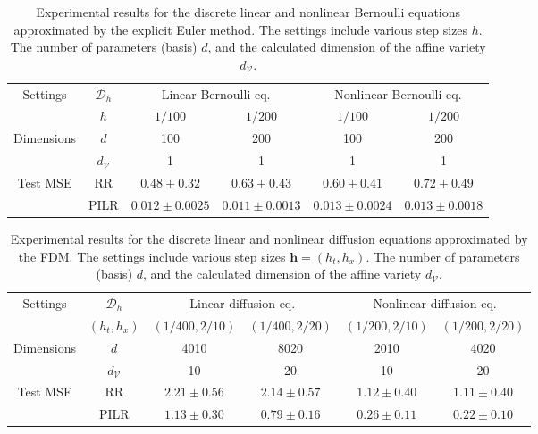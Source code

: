 \documentclass{article}
\theoremstyle{plain}
\theoremstyle{definition}
\theoremstyle{remark}
\begin{document}
\begin{table}[tb]
\caption{Experimental results for the discrete linear and nonlinear Bernoulli equations approximated by the explicit Euler method. The settings include various step sizes \(h\). The number of parameters (basis) \(d\), and the calculated dimension of the affine variety \(d_{\mathcal{V}}\).}
\label{tab:euler-bernoulli}
\begin{center}
\begin{tabular}{cc|cc|cc}
\toprule
\multirow{2}{*}{Settings} & \(\mathscr{D}_h\) & \multicolumn{2}{c|}{Linear Bernoulli eq.} & \multicolumn{2}{c}{Nonlinear Bernoulli eq.} \\ 
& \( h \) & \( 1/100 \) & \( 1/200 \) & \( 1/100 \) & \( 1/200 \)  \\
\multirow{2}{*}{Dimensions} & \( d \) & 100 & 200 & 100 & 200 \\
& \(d_{\mathcal{V}}\) & 1 & 1 & 1 & 1  \\ \midrule 
\multirow{2}{*}{Test MSE} & RR & \(0.48 \pm 0.32\) & \(0.63 \pm 0.43 \) & \(0.60 \pm 0.41\) & \(0.72 \pm 0.49\) \\
& PILR & \(0.012 \pm 0.0025\) & \(0.011 \pm 0.0013\)  & \(0.013 \pm 0.0024\) & \(0.013 \pm 0.0018\)  \\ \bottomrule
\end{tabular}
\end{center}
\vskip -0.1in
\end{table}

\begin{table}[tb]
\caption{Experimental results for the discrete linear and nonlinear diffusion equations approximated by the FDM. The settings include various step sizes \(\bm{h} = (h_t, h_x)\). The number of parameters (basis) \(d\), and the calculated dimension of the affine variety \(d_{\mathcal{V}}\).}
\label{tab:fdm-diffusion}
\begin{center}
\begin{tabular}{cc|cc|cc}
\toprule
\multirow{2}{*}{Settings} & \(\mathscr{D}_h\) 
  & \multicolumn{2}{c|}{Linear diffusion eq.} 
  & \multicolumn{2}{c}{Nonlinear diffusion eq.} \\ 
 & \((h_t, h_x)\) 
  & \(\left(1/400, 2/10\right)\) 
  & \(\left(1/400, 2/20\right)\) 
  & \(\left(1/200, 2/10\right)\) 
  & \(\left(1/200, 2/20\right)\) \\ 
\multirow{2}{*}{Dimensions} 
 & \(d\) 
  & 4010 & 8020 
  & 2010 & 4020 \\ 
 & \(d_{\mathcal{V}}\) 
  & 10   & 20   
  & 10   & 20   \\ 
\midrule 
\multirow{2}{*}{Test MSE} 
 & RR  
  & \(2.21 \pm 0.56\) & \(2.14 \pm 0.57\) 
  & \(1.12 \pm 0.40\) & \(1.11 \pm 0.40\) \\ 
 & PILR
  & \(1.13 \pm 0.30\) & \(0.79 \pm 0.16\) 
  & \(0.26 \pm 0.11\) & \(0.22 \pm 0.10\) \\ 
\bottomrule
\end{tabular}
\end{center}
\vskip -0.1in
\end{table}
\end{document}
